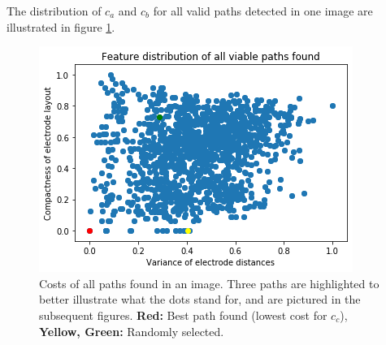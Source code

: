 \documentclass[a4paper, 10pt, twocolumn]{article}
\begin{document}
The distribution of $c_a$ and $c_b$ for all valid paths detected in one image are illustrated in figure \ref{feature_distribution}.
\begin{figure}[ht]
	\centering
  \includegraphics[width=.5\textwidth]{feature_distribution.png}
	\caption{Costs of all paths found in an image. Three paths are highlighted to better illustrate what the dots stand for, and are pictured in the subsequent figures. \textbf{Red:} Best path found (lowest cost for $c_c$), \textbf{Yellow, Green:} Randomly selected.}
	\label{feature_distribution}
\end{figure}
\end{document}
